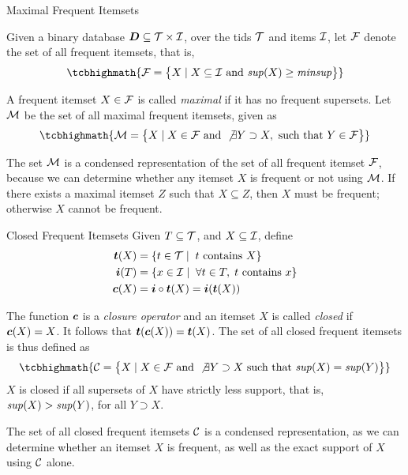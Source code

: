 \begin{frame}{Maximal Frequent Itemsets}

Given a binary database ${\boldsymbol D} \subseteq {\mathcal T} \times {\mathcal I}$,
over the tids ${\mathcal T}$ and items ${\mathcal I}$, let ${\mathcal F}$
denote the set of all frequent itemsets, that is,
\begin{align*}
\tcbhighmath{
\cF = \bigl\{X \mid X \subseteq \cI \mbox{ and } \supp(X) \ge \minsup
\bigr\}
}
\end{align*}

\medskip
A frequent itemset $X \in {\mathcal F}$ is called {\em maximal}
if it has no
frequent supersets. Let ${\mathcal M}$ be the set of all maximal frequent
itemsets, given as
\begin{align*}
\tcbhighmath{
\cM = \bigl\{X \mid X \in \cF \mbox{ and } \not\exists Y \supset X, \mbox{
  such that } Y \in \cF \bigr\}
}
\end{align*}

\medskip
The set ${\mathcal M}$ is a condensed representation of the set of all frequent
itemset ${\mathcal F}$, because we can determine whether any itemset $X$ is
frequent or not using ${\mathcal M}$. If there exists a maximal itemset $Z$ such
that $X \subseteq Z$, then $X$ must be frequent; otherwise $X$ cannot be
frequent. 
\end{frame}



\begin{frame}{Closed Frequent Itemsets}
  \small
Given $T \subseteq {\mathcal T}$, and $X
\subseteq {\mathcal I}$, define
\begin{align*}
  {{\boldsymbol t}}(X) & = \{ t \in {\mathcal T} \mid\; t \text{ contains } X\}\\
  {{\boldsymbol i}}(T) & = \{ x \in {\mathcal I} \mid\; \forall t\in T, \;t \mbox{ contains } x
  \}\\
   {{\boldsymbol c}}(X) & =  {{\boldsymbol i}} \circ {{\boldsymbol t}} (X) = {{\boldsymbol i}} ( {{\boldsymbol t}} (X))
\end{align*}

\medskip
The function ${{\boldsymbol c}}$ is a {\em closure operator} 
and an itemset $X$ is called {\em closed} if ${{\boldsymbol c}}(X) = X$.
It follows that ${{\boldsymbol t}}({{\boldsymbol c}}(X))={{\boldsymbol t}}(X)$. The
set of all closed frequent itemsets is thus def\/{i}ned as
\begin{align*}
\tcbhighmath{
\cC = \bigl\{X \mid X \in  \cF \text{ and } \not\exists Y \supset X
\text{  such that } \supp(X) = \supp(Y)\bigr\}
}
\end{align*}
$X$ is closed if all supersets of $X$ have strictly less
support, that is, $\mathit{sup}(X) > \mathit{sup}(Y)$, for all $Y \supset X$.

\medskip
The set of all closed frequent itemsets ${\mathcal C}$ is a condensed
representation, as we can determine whether an itemset $X$ is
frequent, as well as the exact support of $X$ using ${\mathcal C}$ alone.
\end{frame}


